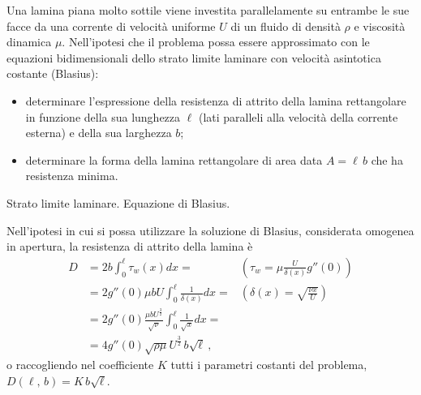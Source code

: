 \noindent
\begin{exerciseS}
    Una lamina piana molto sottile viene investita parallelamente su entrambe le sue facce da una corrente di velocità uniforme $U$ di un fluido di densità $\rho$ e viscosità dinamica $\mu$.
Nell'ipotesi che il problema possa essere approssimato con le equazioni bidimensionali
dello strato limite laminare con velocità asintotica costante (Blasius):
\begin{itemize}
 \item determinare l'espressione della resistenza di attrito della lamina rettangolare in funzione della sua lunghezza $\ell$ (lati paralleli alla velocità della corrente esterna) e della sua larghezza $b$;
 \item determinare la forma della lamina rettangolare di area data $A = \ell \, b$ che ha resistenza minima.
\end{itemize}
\end{exerciseS}

\sol 

\partone Strato limite laminare. Equazione di Blasius. 

\parttwo Nell'ipotesi in cui si possa utilizzare la soluzione di Blasius, considerata 
omogenea in apertura, la resistenza di attrito della lamina è
\begin{equation}
\begin{aligned}
    D & = 2 b \int_0^{\ell} \tau_w(x) dx = & \displaystyle\left(\tau_w = \mu \frac{U}{\delta(x)} g''(0)\right)\\
    & = 2 g''(0) \mu b U \int_0^{\ell} \frac{1}{\delta(x)} dx = & \displaystyle\left(\delta(x) = \sqrt{\frac{\nu x}{U}}\right) \\
    & = 2 g''(0) \frac{\mu b U^{\frac{3}{2}} }{\sqrt{\nu}} \int_0^{\ell} \frac{1}{\sqrt{x}} dx = & \\
    & = 4 g''(0) \sqrt{\rho \mu}  U^{\frac{3}{2}}  \, b \sqrt{\ell} \ , 
\end{aligned}
\end{equation}
o raccogliendo nel coefficiente $K$ tutti i parametri costanti del problema, $D(\ell, \, b) = K \, b \sqrt{\ell}$.

